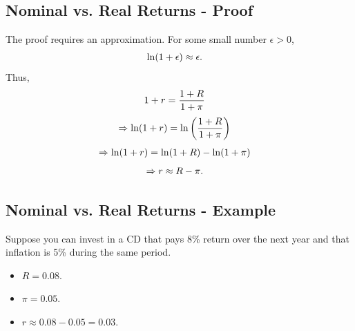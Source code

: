 \documentclass[letterpaper,10pt,english]{sphinxmanual}
\begin{document}
\subsection{Nominal vs. Real Returns - Proof}
\label{returns:nominal-vs-real-returns-proof}
The proof requires an approximation. For some small number $\epsilon >
0$,
\begin{gather}
\begin{split}\ln(1+\epsilon) & \approx \epsilon.\end{split}\notag
\end{gather}
Thus,
\begin{gather}
\begin{split}1+r & = \frac{1+R}{1+\pi}\end{split}\notag
\end{gather}\begin{gather}
\begin{split}\Rightarrow \ln(1+r) & = \ln\left(\frac{1+R}{1+\pi}\right)\end{split}\notag
\end{gather}\begin{gather}
\begin{split}\Rightarrow \ln(1+r) & = \ln(1+R) - \ln(1+\pi)\end{split}\notag
\end{gather}\begin{gather}
\begin{split}\Rightarrow r & \approx R - \pi.\end{split}\notag
\end{gather}

\subsection{Nominal vs. Real Returns - Example}
\label{returns:nominal-vs-real-returns-example}
Suppose you can invest in a CD that pays 8\% return over the next year
and that inflation is 5\% during the same period.
\begin{itemize}
\item {} 
$R = 0.08$.

\end{itemize}
\begin{itemize}
\item {} 
$\pi = 0.05$.

\end{itemize}
\begin{itemize}
\item {} 
$r \approx 0.08 - 0.05 = 0.03$.

\end{itemize}
\end{document}
